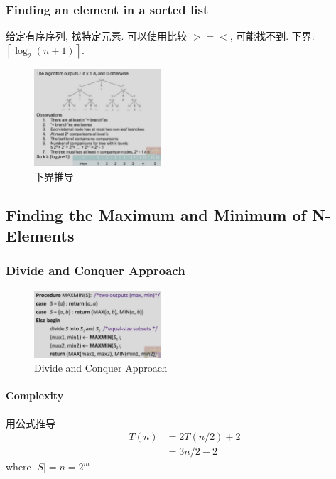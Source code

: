 \subsubsection{Finding an element in a sorted list}
给定有序序列, 找特定元素. 可以使用比较 $>=<$, 可能找不到. 下界: $\left\lceil \log_2(n+1) \right\rceil$. 

\begin{figure}[H]
    \centering
    \includegraphics[width=0.42\textwidth]{pic/DAA2/sorted下界.png}
    \caption{下界推导}
\end{figure}


\subsection[Finding the Maximum and Minimum]{Finding the Maximum and Minimum of N-Elements}

\subsubsection{Divide and Conquer Approach}
\begin{figure}[H]
    \centering
    \includegraphics[width=0.42\textwidth]{pic/DAA2/Divide and Conquer Approach}
    \caption{Divide and Conquer Approach}
\end{figure}

\paragraph{Complexity}用公式推导 
\begin{align*}
    T(n)&=2T(n/2)+2\\
    &=3n/2-2
\end{align*}
where $|S|=n=2^m$


